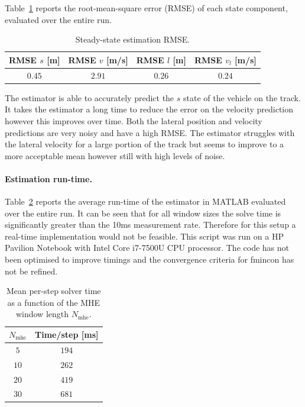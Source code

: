 Table~\ref{tab:est_perf} reports the root-mean-square error (RMSE) of each state component, evaluated over the entire run.

\begin{table}[h]
    \centering
    \begin{tabular}{c|c|c|c}
        RMSE $s$ [m] & RMSE $v$ [m/s] & RMSE $l$ [m] & RMSE $v_{l}$ [m/s] \\ \hline
        $0.45$ & $2.91$ & $0.26$ & $0.24$ \\
    \end{tabular}
    \caption{Steady-state estimation RMSE.}
    \label{tab:est_perf}
\end{table}

The estimator is able to accurately predict the $s$ state of the vehicle on the track. It takes the estimator a long time to reduce the error on the velocity prediction however this improves over time. Both the lateral position and velocity predictions are very noisy and have a high RMSE. The estimator struggles with the lateral velocity for a large portion of the track but seems to improve to a more acceptable mean however still with high levels of noise. 

\paragraph{Estimation run-time.}
Table~\ref{tab:est_time} reports the average run-time of the estimator in MATLAB evaluated over the entire run. It can be seen that for all window sizes the solve time is significantly greater than the 10ms measurement rate. Therefore for this setup a real-time implementation would not be feasible. This script was run on a HP Pavilion Notebook with Intel Core i7-7500U CPU processor. The code has not been optimised to improve timings and the convergence criteria for fmincon has not be refined. 

\begin{table}[H]
    \centering
    \begin{tabular}{c|c}
        $N_{\text{mhe}}$ & Time/step [ms] \\ \hline
        $5$  & $194$   \\
        $10$ & $262$   \\
        $20$ & $419$  \\
        $30$ & $681$  \\
    \end{tabular}
    \caption{Mean per-step solver time as a function of the MHE window length $N_{\text{mhe}}$.}
    \label{tab:est_time}
\end{table}

